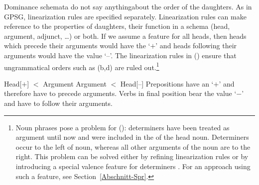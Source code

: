 Dominance schemata do not say anything\indexgpsg about the order of the daughters. As in GPSG, linearization rules are specified separately.
Linearization rules can make reference to the properties of daughters, their function in a schema (head, argument,
adjunct, \ldots) or both.
If we assume a feature \initial{} for all heads, then heads which precede their arguments would have the \initialv `$+$' and heads following their
  arguments would have the value `--'. The linearization rules in () ensure that ungrammatical orders such as (b,d) are
  ruled out.\footnote{
  Noun phrases pose a problem for (): determiners have been treated as argument until now and were included in the \subcatl of the
  head noun. Determiners occur to the left of noun, whereas all other arguments of the noun are to the right. This problem can be solved either
  by refining linearization rules \citep[--165]{Mueller99a} or by introducing a special valence feature for determiners
  \citep[Section~9.4]{ps2}. For an approach using such a
  feature, see Section~\ref{Abschnitt-Spr}.%
}

\eal
\ex\label{lp-ini-arg} 
Head[\initial$+$] $<$ Argument
\ex 
Argument $<$ Head[\initial --]
\zl
Prepositions have an \initialv `$+$' and therefore have to precede arguments. Verbs in final position bear the value `$-$' and have to follow
their arguments.
\eal
{}
\ex[*]{
\gll {}[[den Schrank] in]\\
     \hspaceThis{[[}the cupboard in\\
}
\zl


